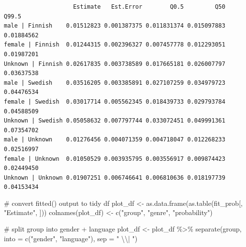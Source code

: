 \documentclass[
  letterpaper,
  DIV=11,
  numbers=noendperiod]{scrartcl}
\newenvironment{Shaded}{\begin{snugshade}}{\end{snugshade}}
\newcommand{\AttributeTok}[1]{\textcolor[rgb]{0.40,0.45,0.13}{#1}}
\newcommand{\CommentTok}[1]{\textcolor[rgb]{0.37,0.37,0.37}{#1}}
\newcommand{\FunctionTok}[1]{\textcolor[rgb]{0.28,0.35,0.67}{#1}}
\newcommand{\NormalTok}[1]{\textcolor[rgb]{0.00,0.23,0.31}{#1}}
\newcommand{\OtherTok}[1]{\textcolor[rgb]{0.00,0.23,0.31}{#1}}
\newcommand{\SpecialCharTok}[1]{\textcolor[rgb]{0.37,0.37,0.37}{#1}}
\newcommand{\StringTok}[1]{\textcolor[rgb]{0.13,0.47,0.30}{#1}}
\begin{document}
\begin{verbatim}
                    Estimate   Est.Error        Q0.5         Q50      Q99.5
male | Finnish    0.01512823 0.001387375 0.011831374 0.015097883 0.01884562
female | Finnish  0.01244315 0.002396327 0.007457778 0.012293051 0.01987201
Unknown | Finnish 0.02617835 0.003738589 0.017665181 0.026007797 0.03637538
male | Swedish    0.03516205 0.003385891 0.027107259 0.034979723 0.04476534
female | Swedish  0.03017714 0.005562345 0.018439733 0.029793784 0.04588509
Unknown | Swedish 0.05058632 0.007797744 0.033072451 0.049991361 0.07354702
male | Unknown    0.01276456 0.004071359 0.004718047 0.012268233 0.02516997
female | Unknown  0.01050529 0.003935795 0.003556917 0.009874423 0.02449450
Unknown | Unknown 0.01907251 0.006746641 0.006810636 0.018197739 0.04153434
\end{verbatim}

\begin{Shaded}
\begin{Highlighting}[]
\CommentTok{\# convert fitted() output to tidy df}
\NormalTok{plot\_df }\OtherTok{\textless{}{-}} \FunctionTok{as.data.frame}\NormalTok{(}\FunctionTok{as.table}\NormalTok{(fit\_prob[, }\StringTok{"Estimate"}\NormalTok{, ]))}
\FunctionTok{colnames}\NormalTok{(plot\_df) }\OtherTok{\textless{}{-}} \FunctionTok{c}\NormalTok{(}\StringTok{"group"}\NormalTok{, }\StringTok{"genre"}\NormalTok{, }\StringTok{"probability"}\NormalTok{)}

\CommentTok{\# split group into gender + language}
\NormalTok{plot\_df }\OtherTok{\textless{}{-}}\NormalTok{ plot\_df }\SpecialCharTok{\%\textgreater{}\%}
  \FunctionTok{separate}\NormalTok{(group, }\AttributeTok{into =} \FunctionTok{c}\NormalTok{(}\StringTok{"gender"}\NormalTok{, }\StringTok{"language"}\NormalTok{), }\AttributeTok{sep =} \StringTok{" }\SpecialCharTok{\textbackslash{}\textbackslash{}}\StringTok{| "}\NormalTok{)}


\end{Highlighting}
\end{Shaded}
\end{document}
